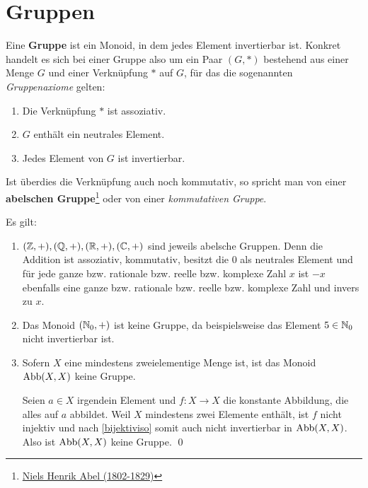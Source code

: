 \section{Gruppen}


\begin{de}[Gruppe]  
    Eine \textbf{Gruppe} ist ein Monoid, in dem jedes Element invertierbar ist. Konkret handelt es sich bei einer Gruppe also um ein Paar $(G,*)$ bestehend aus einer Menge $G$ und einer Verknüpfung $*$ auf $G$, für das die sogenannten \emph{Gruppenaxiome} gelten:
    \begin{enumerate}[(G1), labelindent=1.5em, leftmargin=*]
        \item Die Verknüpfung $*$ ist assoziativ.
        \item $G$ enthält ein neutrales Element.
        \item Jedes Element von $G$ ist invertierbar.
    \end{enumerate}
    Ist überdies die Verknüpfung auch noch kommutativ, so spricht man von einer \textbf{abelschen Gruppe}\footnote{\href{https://de.wikipedia.org/wiki/Niels_Henrik_Abel}{Niels Henrik Abel (1802-1829)}} oder von einer \emph{kommutativen Gruppe}.
\end{de}


\begin{bsp}
    Es gilt:
    \begin{enumerate}
        \item $(\mathbb Z,+),(\mathbb Q,+),(\mathbb R,+),(\mathbb C,+)$ sind jeweils abelsche Gruppen. Denn die Addition ist assoziativ, kommutativ, besitzt die $0$ als neutrales Element und für jede ganze bzw. rationale bzw. reelle bzw. komplexe Zahl $x$ ist $-x$ ebenfalls eine ganze bzw. rationale bzw. reelle bzw. komplexe Zahl und invers zu $x$.
        \item Das Monoid $(\mathbb N_0,+)$ ist keine Gruppe, da beispielsweise das Element $5\in \mathbb N_0$ nicht invertierbar ist.
        \item Sofern $X$ eine mindestens zweielementige Menge ist, ist das Monoid $\operatorname{Abb}(X,X)$ keine Gruppe.
        \begin{bew}[(*)]
            Seien $a\in X$ irgendein Element und $f:X\to X$ die konstante Abbildung, die alles auf $a$ abbildet. Weil $X$ mindestens zwei Elemente enthält, ist $f$ nicht injektiv und nach \cref{bijektiviso} somit auch nicht invertierbar in $\operatorname{Abb}(X,X)$. Also ist $\operatorname{Abb}(X,X)$ keine Gruppe. \qed
        \end{bew}
    \end{enumerate}
\end{bsp}


